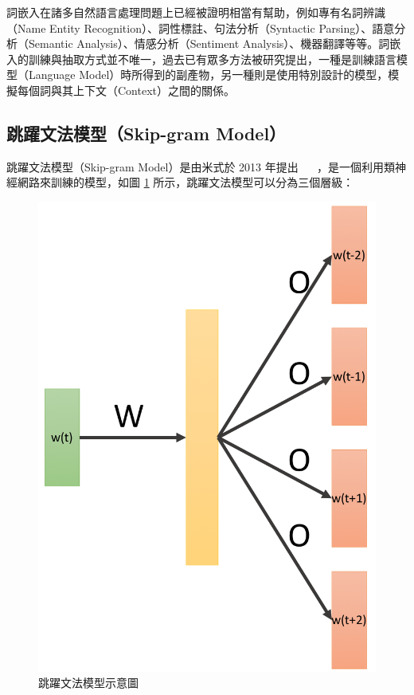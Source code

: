 詞嵌入在諸多自然語言處理問題上已經被證明相當有幫助，例如專有名詞辨識（Name Entity Recognition）、詞性標註、句法分析（Syntactic Parsing）、語意分析（Semantic Analysis）、情感分析（Sentiment Analysis）、機器翻譯等等。詞嵌入的訓練與抽取方式並不唯一，過去已有眾多方法被研究提出，一種是訓練語言模型（Language Model）時所得到的副產物，另一種則是使用特別設計的模型，模擬每個詞與其上下文（Context）之間的關係。%
\subsection{跳躍文法模型（Skip-gram Model）}
跳躍文法模型（Skip-gram Model）是由米式於 2013 年提出 ~\cite{mikolov2013distributed}~\cite{mikolov2013efficient} ，是一個利用類神經網路來訓練的模型，如圖 \ref{fig:skip_gram} 所示，跳躍文法模型可以分為三個層級：
\begin{figure}[h]
    \centering
    \includegraphics[scale=0.35]{images/chap2_skipgram.png}
    \caption{跳躍文法模型示意圖}\label{fig:skip_gram}
\end{figure}
